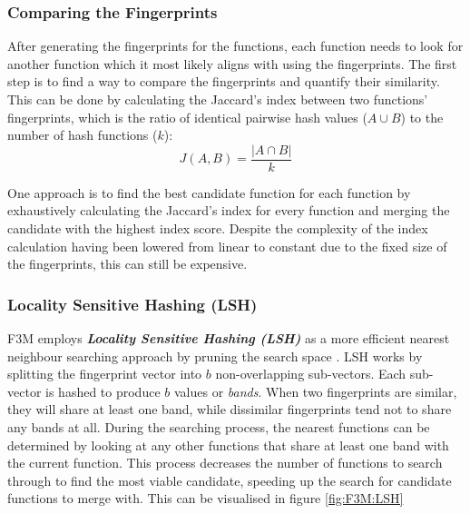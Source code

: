 \subsubsection{Comparing the Fingerprints}
After generating the fingerprints for the functions, each function needs to look for another function which it most likely aligns with using the fingerprints. The first step is to find a way to compare the fingerprints and quantify their similarity. This can be done by calculating the Jaccard's index between two functions' fingerprints, which is the ratio of identical pairwise hash values ($A \cup B$) to the number of hash functions ($k$):
$$J(A, B) = \frac{|A\cap B|}{k}$$

One approach is to find the best candidate function for each function by exhaustively calculating the Jaccard's index for every function and merging the candidate with the highest index score. Despite the complexity of the index calculation having been lowered from linear to constant due to the fixed size of the fingerprints, this can still be expensive.


\subsubsection{Locality Sensitive Hashing (LSH)}
F3M employs \textbf{\textit{Locality Sensitive Hashing (LSH)}} as a more efficient nearest neighbour searching approach by pruning the search space \cite{F3M:LSH}. LSH works by splitting the fingerprint vector into $b$ non-overlapping sub-vectors. Each sub-vector is hashed to produce $b$ values or \textit{bands}. When two fingerprints are similar, they will share at least one band, while dissimilar fingerprints tend not to share any bands at all. During the searching process, the nearest functions can be determined by looking at any other functions that share at least one band with the current function. This process decreases the number of functions to search through to find the most viable candidate, speeding up the search for candidate functions to merge with. This can be visualised in figure \ref{fig:F3M:LSH}

